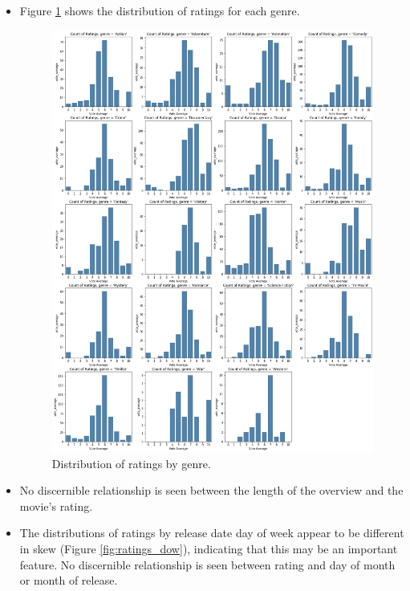 \documentclass[12pt, oneside]{article}   	%
\begin{document}
\begin{itemize}
\item Figure \ref{fig:ratings_by_genre} shows the distribution of ratings for each genre.

\begin{figure}%
\includegraphics[height=0.9\textheight]{ratings_by_genre}
\caption{\label{fig:ratings_by_genre}Distribution of ratings by genre.}
\end{figure}

\item No discernible relationship is seen between the length of the overview and the movie's rating.

\item The distributions of ratings by release date day of week appear to be different in skew (Figure \ref{fig:ratings_dow}), indicating that this may be an important feature. No discernible relationship is seen between rating and day of month or month of release.


\end{itemize}
\end{document}
